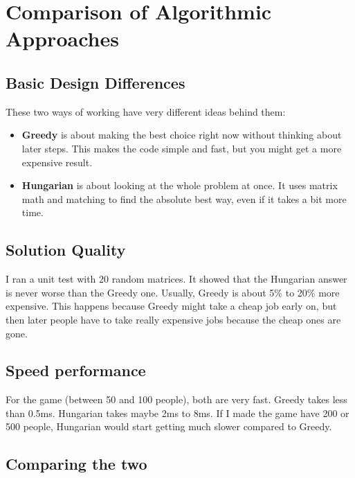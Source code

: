\documentclass[12pt,a4paper]{article}
\begin{document}
\clearpage
\section{Comparison of Algorithmic Approaches}

\subsection{Basic Design Differences}

These two ways of working have very different ideas behind them:

\begin{itemize}
    \item \textbf{Greedy} is about making the best choice right now without 
          thinking about later steps. This makes the code simple and fast, 
          but you might get a more expensive result.
    \item \textbf{Hungarian} is about looking at the whole problem at once. 
          It uses matrix math and matching to find the absolute best way, 
          even if it takes a bit more time.
\end{itemize}

\subsection{Solution Quality}

I ran a unit test with 20 random matrices. It showed that the Hungarian 
answer is never worse than the Greedy one. Usually, Greedy is about 
5\% to 20\% more expensive. This happens because Greedy might take a 
cheap job early on, but then later people have to take really expensive 
jobs because the cheap ones are gone.

\subsection{Speed performance}

For the game (between 50 and 100 people), both are very fast. Greedy 
takes less than 0.5ms. Hungarian takes maybe 2ms to 8ms. If I made the 
game have 200 or 500 people, Hungarian would start getting much 
slower compared to Greedy.

\subsection{Comparing the two}
\end{document}
